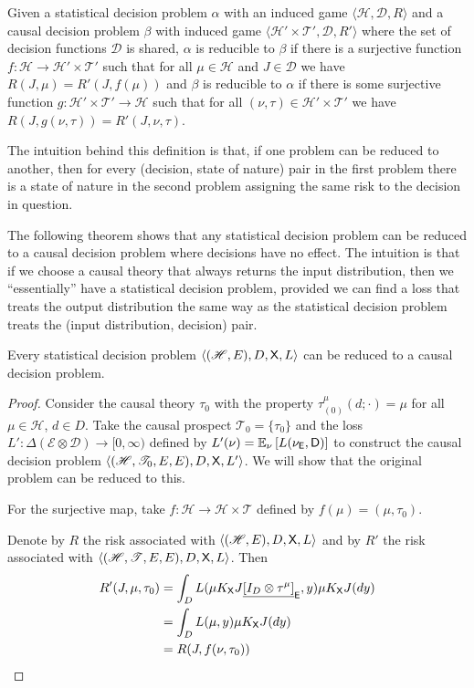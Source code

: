 \begin{definition}
Given a statistical decision problem $\alpha$ with an induced game $\langle \mathscr{H}, \mathscr{D}, R\rangle$ and a causal decision problem $\beta$ with induced game $\langle \mathscr{H}'\times \mathscr{T}', \mathscr{D}, R'\rangle$ where the set of decision functions $\mathscr{D}$ is shared, $\alpha$ is reducible to $\beta$ if there is a surjective function $f:\mathscr{H}\to \mathscr{H}'\times\mathscr{T}'$ such that for all $\mu\in \mathscr{H}$ and $J\in \mathscr{D}$ we have $R(J,\mu)=R'(J,f(\mu))$ and $\beta$ is reducible to $\alpha$ if there is some surjective function $g:\mathscr{H}'\times\mathscr{T}'\to \mathscr{H}$ such that for all $(\nu,\tau)\in \mathscr{H}'\times \mathscr{T}'$ we have $R(J,g(\nu,\tau))=R'(J,\nu,\tau)$.
\end{definition}

The intuition behind this definition is that, if one problem can be reduced to another, then for every (decision, state of nature) pair in the first problem there is a state of nature in the second problem assigning the same risk to the decision in question.

The following theorem shows that any statistical decision problem can be reduced to a causal decision problem where decisions have no effect. The intuition is that if we choose a causal theory that always returns the input distribution, then we ``essentially'' have a statistical decision problem, provided we can find a loss that treats the output distribution the same way as the statistical decision problem treats the (input distribution, decision) pair.

\begin{theorem}
Every statistical decision problem $\langle (\mathscr{H},E),D,\mathsf{X},L\rangle$ can be reduced to a causal decision problem.
\end{theorem}
\begin{proof}
Consider the causal theory $\tau_0$ with the property $\tau_(0)^\mu(d;\cdot)=\mu$ for all $\mu\in\mathscr{H}$, $d\in D$. Take the causal prospect $\mathscr{T}_0=\{\tau_0\}$ and the loss $L':\Delta(\mathcal{E}\otimes\mathcal{D})\to[0,\infty)$ defined by $L'(\nu) = \mathbb{E}_\nu \left[L(\nu_{\mathsf{E}},\mathsf{D})\right]$ to construct the causal decision problem $\langle (\mathscr{H},\mathscr{T}_0,E,E),D,\mathsf{X},L'\rangle$. We will show that the original problem can be reduced to this.

For the surjective map, take $f:\mathscr{H}\to \mathscr{H}\times\mathscr{T}$ defined by $f(\mu)=(\mu,\tau_0)$.

Denote by $R$ the risk associated with $\langle (\mathscr{H},E),D,\mathsf{X},L\rangle$ and by $R'$ the risk associated with $\langle (\mathscr{H},\mathscr{T},E,E),D,\mathsf{X},L\rangle$. Then
\begin{align}
    R'(J,\mu,\tau_0) &= \int_D L(\mu K_{\mathsf{X}} J\underline{[I_D\otimes \tau^\mu]}_{\mathsf{E}}, y) \mu K_{\mathsf{X}} J(dy)\\
                   &= \int_D L(\mu,y) \mu K_{\mathsf{X}} J(dy)\\
                   &=R(J,f(\nu,\tau_0))
\end{align}
\end{proof}

